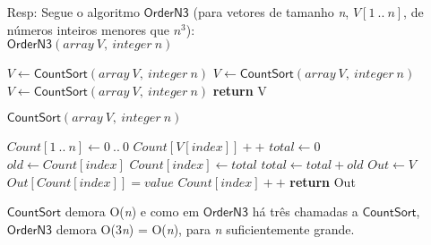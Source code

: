 \documentclass{homework}
\begin{document}
	\begin{enumerate}
		\item[Resp:] Segue o algoritmo $\mathsf{OrderN3}$ (para vetores de tamanho \textit{n}, $V[1\ ..\ n]$, de números inteiros menores que $n^3$):\\
			$\mathsf{OrderN3}(array\ V,\ integer\ n)$
			\begin{algorithmic}[1]
			    \State $V \gets \mathsf{CountSort}(array\ V,\ integer\ n)$
			    \State $V \gets \mathsf{CountSort}(array\ V,\ integer\ n)$
			    \State $V \gets \mathsf{CountSort}(array\ V,\ integer\ n)$
				\State \textbf{return} V
			\end{algorithmic}
			$\mathsf{CountSort}(array\ V,\ integer\ n)$
			\begin{algorithmic}[1]
			    \State $Count[1\ ..\ n] \gets {0\ ..\ 0}$
			        \State $Count[V[index]]++$
			    \EndFor
			    \State $total \gets 0$
			        \State $old \gets Count[index]$
			        \State $Count[index] \gets total$
			        \State $total \gets total + old$
			    \EndFor
			    \State $Out \gets V$
			        \State $Out[Count[index]] = value$
			        \State $Count[index]++$
			    \EndFor
				\State \textbf{return} Out
			\end{algorithmic}
            $\mathsf{CountSort}$ demora O(\textit{n}) e como em $\mathsf{OrderN3}$ há três chamadas a $\mathsf{CountSort}$, $\mathsf{OrderN3}$ demora O(3\textit{n}) = O(\textit{n}), para \textit{n} suficientemente grande.
    \end{enumerate}
\end{document}
